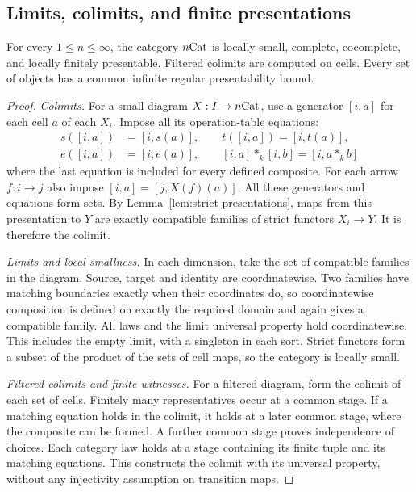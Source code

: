 \subsection{Limits, colimits, and finite presentations}

\begin{proposition}
\label{prop:strict-presentability}
For every $1\le n\le\infty$, the category $n\mathrm{Cat}$ is locally small,
complete, cocomplete, and locally finitely presentable. Filtered
colimits are computed on cells. Every set of objects has a common
infinite regular presentability bound.
\end{proposition}

\begin{proof}
\emph{Colimits.}
For a small diagram $X:I\to n\mathrm{Cat}$, use a generator $[i,a]$ for
each cell $a$ of each $X_i$. Impose all its operation-table
equations:
\[
\begin{split}
 s([i,a])&=[i,s(a)],\qquad t([i,a])=[i,t(a)],\\
 e([i,a])&=[i,e(a)],\qquad
 [i,a]*_k[i,b]=[i,a*_k b]
\end{split}
\]
where the last equation is included for every defined composite.
For each arrow $f:i\to j$ also impose
$[i,a]=[j,X(f)(a)]$. All these generators and equations form
sets. By Lemma~\ref{lem:strict-presentations}, maps from this
presentation to $Y$ are exactly compatible families of strict
functors $X_i\to Y$. It is therefore the colimit.

\emph{Limits and local smallness.}
In each dimension, take the set of compatible families in the
diagram. Source, target and identity are coordinatewise.
Two families have matching boundaries exactly when their
coordinates do, so coordinatewise composition is defined on
exactly the required domain and again gives a compatible family.
All laws and the limit universal property hold coordinatewise.
This includes the empty limit, with a singleton in each sort.
Strict functors form a subset of the product of the sets of
cell maps, so the category is locally small.

\emph{Filtered colimits and finite witnesses.}
For a filtered diagram, form the colimit of each set of cells.
Finitely many representatives occur at a common stage. If a
matching equation holds in the colimit, it holds at a later
common stage, where the composite can be formed. A further
common stage proves independence of choices. Each category law
holds at a stage containing its finite tuple and its matching
equations. This constructs the colimit with its universal
property, without any injectivity assumption on transition maps.


\end{proof}
